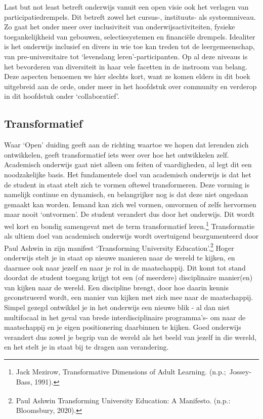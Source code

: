 \documentclass{jote-book}
\begin{document}
	Last but not least betreft onderwijs vanuit een open visie ook het verlagen van participatiedrempels. Dit betreft zowel het cursus-, instituuts- als systeemniveau. Zo gaat het onder meer over inclusiviteit van onderwijsactiviteiten, fysieke toegankelijkheid van gebouwen, selectiesystemen en financiële drempels. Idealiter is het onderwijs inclusief en divers in wie toe kan treden tot de leergemeenschap, van pre-universitaire tot ‘levenslang leren'-participanten. Op al deze niveaus is het bevorderen van diversiteit in haar vele facetten in de instroom van belang. Deze aspecten benoemen we hier slechts kort, want ze komen elders in dit boek uitgebreid aan de orde, onder meer in het hoofdstuk over community en verderop in dit hoofdstuk onder ‘collaboratief'.



	\subsection{Transformatief}



	Waar ‘Open' duiding geeft aan de richting waartoe we hopen dat lerenden zich ontwikkelen, geeft transformatief iets weer over hoe het ontwikkelen zelf. Academisch onderwijs gaat niet alleen om feiten of vaardigheden, al legt dit een noodzakelijke basis. Het fundamentele doel van academisch onderwijs is dat het de student in staat stelt zich te vormen oftewel transformeren. Deze vorming is namelijk continue en dynamisch, en belangrijker nog is dat deze niet ongedaan gemaakt kan worden. Iemand kan zich wel vormen, omvormen of zelfs hervormen maar nooit ‘ontvormen'. De student verandert dus door het onderwijs. Dit wordt wel kort en bondig samengevat met de term transformatief leren.\footnote{Jack Mezirow, Transformative Dimensions of Adult Learning. (n.p.; Jossey-Bass, 1991).} Transformatie als ultiem doel van academisch onderwijs wordt overtuigend beargumenteerd door Paul Ashwin in zijn manifest ‘Transforming University Education'.\footnote{\textsuperscript{ }Paul Ashwin Transforming University Education: A Manifesto. (n.p.: Bloomsbury, 2020).} Hoger onderwijs stelt je in staat op nieuwe manieren naar de wereld te kijken, en daarmee ook naar jezelf en naar je rol in de maatschappij. Dit komt tot stand doordat de student toegang krijgt tot een (of meerdere) disciplinaire manier(en) van kijken naar de wereld. Een discipline brengt, door hoe daarin kennis geconstrueerd wordt, een manier van kijken met zich mee naar de maatschappij. Simpel gezegd ontwikkel je in het onderwijs een nieuwe blik - al dan niet multifocaal in het geval van brede interdisciplinaire programma's- om naar de maatschappij en je eigen positionering daarbinnen te kijken. Goed onderwijs verandert dus zowel je begrip van de wereld als het beeld van jezelf in die wereld, en het stelt je in staat bij te dragen aan verandering.
\end{document}
